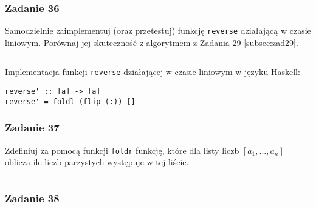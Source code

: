 \documentclass[11pt,a4paper]{article}
\begin{document}
\subsubsection{Zadanie 36}
Samodzielnie zaimplementuj (oraz przetestuj) funkcję \texttt{reverse} działającą w czasie liniowym. Porównaj jej skuteczność z algorytmem z Zadania 29 \ref{subsec:zad29}.

\bigskip
\hrule
\bigskip

Implementacja funkcji \texttt{reverse} działającej w czasie liniowym w języku Haskell:
\begin{Verbatim}[frame=single]
reverse' :: [a] -> [a]
reverse' = foldl (flip (:)) []
\end{Verbatim}

\subsubsection{Zadanie 37}
Zdefiniuj za pomocą funkcji \texttt{foldr} funkcję, które dla listy liczb $[a_1, \dots, a_n]$ oblicza ile liczb parzystych występuje w tej liście.

\bigskip
\hrule
\bigskip


\subsubsection{Zadanie 38}
\end{document}
